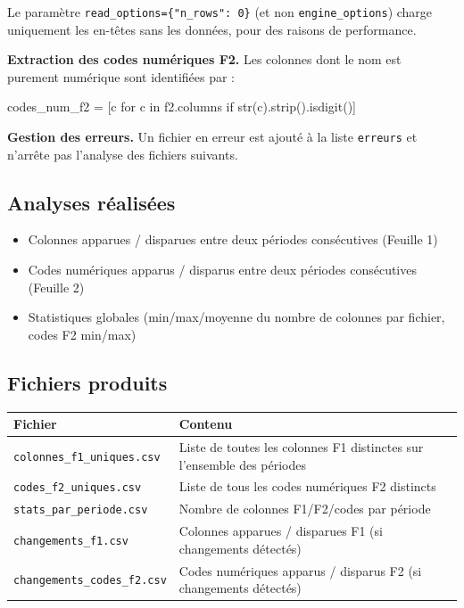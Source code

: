 \documentclass[12pt,a4paper,french]{report}
\begin{document}
Le paramètre \texttt{read\_options=\{"n\_rows": 0\}} (et non
\texttt{engine\_options}) charge uniquement les en-têtes sans les données,
pour des raisons de performance.

\textbf{Extraction des codes numériques F2.} Les colonnes dont le nom est
purement numérique sont identifiées par :

\begin{codebox}[]
codes\_num\_f2 = [c for c in f2.columns if str(c).strip().isdigit()]
\end{codebox}

\textbf{Gestion des erreurs.} Un fichier en erreur est ajouté à la liste
\texttt{erreurs} et n'arrête pas l'analyse des fichiers suivants.

\subsection{Analyses réalisées}

\begin{itemize}
  \item Colonnes apparues / disparues entre deux périodes consécutives
        (Feuille 1)
  \item Codes numériques apparus / disparus entre deux périodes
        consécutives (Feuille 2)
  \item Statistiques globales (min/max/moyenne du nombre de colonnes par
        fichier, codes F2 min/max)
\end{itemize}

\subsection{Fichiers produits}

\begin{tabularx}{\textwidth}{lX}
  \toprule
  \textbf{Fichier} & \textbf{Contenu} \\
  \midrule
  \texttt{colonnes\_f1\_uniques.csv} & Liste de toutes les colonnes F1
    distinctes sur l'ensemble des périodes \\
  \texttt{codes\_f2\_uniques.csv} & Liste de tous les codes numériques F2
    distincts \\
  \texttt{stats\_par\_periode.csv} & Nombre de colonnes F1/F2/codes par
    période \\
  \texttt{changements\_f1.csv} & Colonnes apparues / disparues F1
    (si changements détectés) \\
  \texttt{changements\_codes\_f2.csv} & Codes numériques apparus / disparus F2
    (si changements détectés) \\
  \bottomrule
\end{tabularx}
\end{document}
